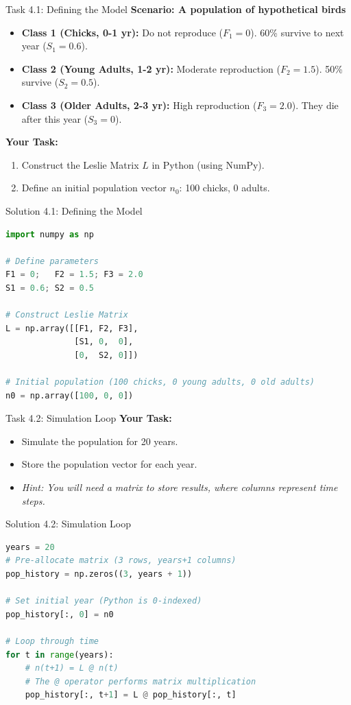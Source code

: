 \begin{frame}{Task 4.1: Defining the Model}
\textbf{Scenario: A population of hypothetical birds}
\begin{itemize}
    \item \textbf{Class 1 (Chicks, 0-1 yr):} Do not reproduce ($F_1=0$). 60\% survive to next year ($S_1=0.6$).
    \item \textbf{Class 2 (Young Adults, 1-2 yr):} Moderate reproduction ($F_2=1.5$). 50\% survive ($S_2=0.5$).
    \item \textbf{Class 3 (Older Adults, 2-3 yr):} High reproduction ($F_3=2.0$). They die after this year ($S_3=0$).
\end{itemize}
\vspace{1em}
\textbf{Your Task:}
\begin{enumerate}
    \item Construct the Leslie Matrix $L$ in Python (using NumPy).
    \item Define an initial population vector $n_0$: 100 chicks, 0 adults.
\end{enumerate}
\end{frame}

\begin{frame}[fragile]{Solution 4.1: Defining the Model}
\small
\begin{lstlisting}[language=Python]
import numpy as np

# Define parameters
F1 = 0;   F2 = 1.5; F3 = 2.0
S1 = 0.6; S2 = 0.5

# Construct Leslie Matrix
L = np.array([[F1, F2, F3],
              [S1, 0,  0],
              [0,  S2, 0]])

# Initial population (100 chicks, 0 young adults, 0 old adults)
n0 = np.array([100, 0, 0])
\end{lstlisting}
\end{frame}

\begin{frame}{Task 4.2: Simulation Loop}
\textbf{Your Task:}
\begin{itemize}
    \item Simulate the population for 20 years.
    \item Store the population vector for each year.
    \item \textit{Hint: You will need a matrix to store results, where columns represent time steps.}
\end{itemize}
\end{frame}

\begin{frame}[fragile]{Solution 4.2: Simulation Loop}
\small
\begin{lstlisting}[language=Python]
years = 20
# Pre-allocate matrix (3 rows, years+1 columns)
pop_history = np.zeros((3, years + 1))

# Set initial year (Python is 0-indexed)
pop_history[:, 0] = n0

# Loop through time
for t in range(years):
    # n(t+1) = L @ n(t)
    # The @ operator performs matrix multiplication
    pop_history[:, t+1] = L @ pop_history[:, t]
\end{lstlisting}
\end{frame}

